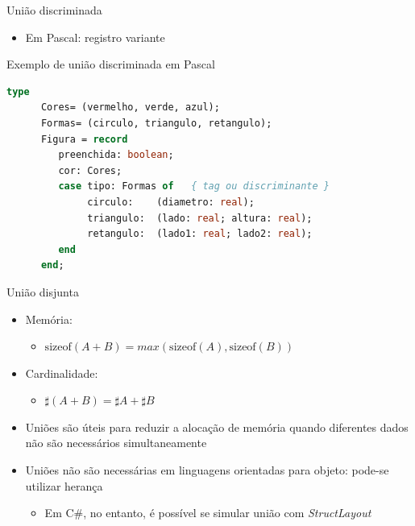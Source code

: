 \documentclass[handout]{beamer}
\begin{document}
\begin{frame}[fragile]{União discriminada}

   \begin{itemize}
		\item Em Pascal: registro variante
   \end{itemize}
\begin{block}{Exemplo de união discriminada em Pascal }
	\begin{lstlisting}[language=Pascal,numbers=none]
   type
      Cores= (vermelho, verde, azul);
      Formas= (circulo, triangulo, retangulo);
      Figura = record
         preenchida: boolean;
         cor: Cores;
         case tipo: Formas of   { tag ou discriminante }
              circulo:    (diametro: real);
              triangulo:  (lado: real; altura: real);
              retangulo:  (lado1: real; lado2: real);
         end
      end;
	\end{lstlisting}
\end{block}

\end{frame}



\begin{frame}{União disjunta}
		\begin{itemize}
			\item Memória:
				\begin{itemize}
					\item $\mathrm{sizeof}(A + B) = max(\mathrm{sizeof}(A),\mathrm{sizeof}(B))$
				\end{itemize}

			\item Cardinalidade:
				\begin{itemize}
					\item $\sharp(A + B) = \sharp A + \sharp B$
				\end{itemize}

			\item Uniões são úteis para reduzir a alocação de memória quando diferentes dados não são necessários simultaneamente
			\item Uniões não são necessárias em linguagens orientadas para objeto: pode-se utilizar herança
			\begin{itemize}
				\item Em C\#, no entanto, é possível se simular união com \textit{StructLayout}
			\end{itemize}

		\end{itemize}
 \end{frame}
\end{document}
